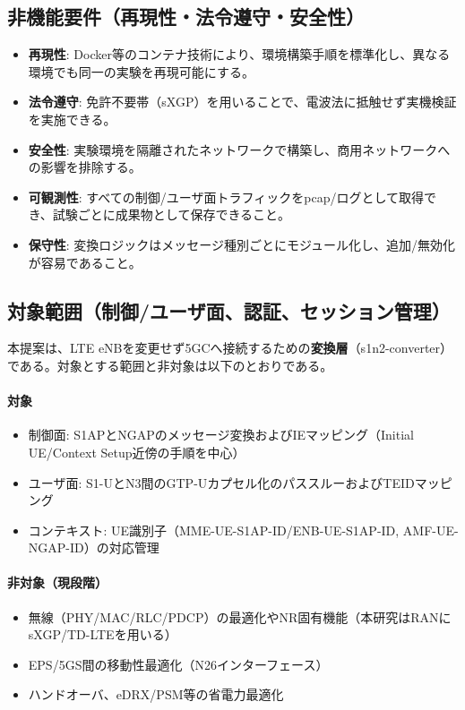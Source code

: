 \subsection{非機能要件（再現性・法令遵守・安全性）}
\begin{itemize}
	\item \textbf{再現性}: Docker等のコンテナ技術により、環境構築手順を標準化し、異なる環境でも同一の実験を再現可能にする。
	\item \textbf{法令遵守}: 免許不要帯（sXGP）を用いることで、電波法に抵触せず実機検証を実施できる。
	\item \textbf{安全性}: 実験環境を隔離されたネットワークで構築し、商用ネットワークへの影響を排除する。
		\item \textbf{可観測性}: すべての制御/ユーザ面トラフィックをpcap/ログとして取得でき、試験ごとに成果物として保存できること。
		\item \textbf{保守性}: 変換ロジックはメッセージ種別ごとにモジュール化し、追加/無効化が容易であること。
\end{itemize}

\subsection{対象範囲（制御/ユーザ面、認証、セッション管理）}
本提案は、LTE eNBを変更せず5GCへ接続するための\textbf{変換層}（s1n2-converter）である。対象とする範囲と非対象は以下のとおりである。

\paragraph{対象}
\begin{itemize}
	\item 制御面: S1APとNGAPのメッセージ変換およびIEマッピング（Initial UE/Context Setup近傍の手順を中心）
	\item ユーザ面: S1-UとN3間のGTP-Uカプセル化のパススルーおよびTEIDマッピング
	\item コンテキスト: UE識別子（MME-UE-S1AP-ID/ENB-UE-S1AP-ID, AMF-UE-NGAP-ID）の対応管理
\end{itemize}

\paragraph{非対象（現段階）}
\begin{itemize}
	\item 無線（PHY/MAC/RLC/PDCP）の最適化やNR固有機能（本研究はRANにsXGP/TD-LTEを用いる）
	\item EPS/5GS間の移動性最適化（N26インターフェース）\cite{threegpp-23502}
	\item ハンドオーバ、eDRX/PSM等の省電力最適化
\end{itemize}

